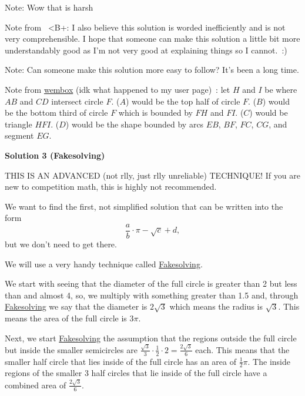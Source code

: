 \begin{enumerate}
 Note: Wow that is harsh

 Note from ~<B+: I also believe this solution is worded inefficiently and is not very comprehensible. I hope that someone can make this solution a little bit more understandably good as I'm not very good at explaining things so I cannot. :)

 Note: Can someone make this solution more easy to follow? It’s been a long time.

 Note from \href{https://artofproblemsolving.com/wiki/index.php?title=User:Wembox&action=edit&redlink=1}{wembox} (idk what happened to my user page) : let $H$ and $I$ be where $AB$ and $CD$ intersect circle $F$. ($A$) would be the top half of circle $F$. ($B$) would be the bottom third of circle $F$ which is bounded by $FH$ and $FI$. ($C$) would be triangle $HFI$. ($D$) would be the shape bounded by arcs $EB$, $BF$, $FC$, $CG$, and segment $EG$.

 



\textbf{Solution 3 (Fakesolving)}

THIS IS AN ADVANCED (not rlly, just rlly unreliable) TECHNIQUE! If you are new to competition math, this is highly not recommended.

 We want to find the first, not simplified solution that can be written into the form 
 \[\frac{a}{b}\cdot\pi-\sqrt{c}+d,\] but we don't need to get there.

 We will use a very handy technique called \href{https://artofproblemsolving.com/wiki/index.php/Fakesolving?srsltid=AfmBOooIYJBasY2JG2w6ib8tmkZzk\_s4gHj3D43Dmllv1jje2xbw7KzG}{Fakesolving}.

 We start with seeing that the diameter of the full circle is greater than 2 but less than and almost 4, so, we multiply with something greater than 1.5 and, through \href{https://artofproblemsolving.com/wiki/index.php/Fakesolving?srsltid=AfmBOooIYJBasY2JG2w6ib8tmkZzk\_s4gHj3D43Dmllv1jje2xbw7KzG}{Fakesolving} we say that the diameter is \( 2\sqrt{3} \) which means the radius is \( \sqrt{3} \). This means the area of the full circle is \( 3\pi \).

 Next, we start \href{https://artofproblemsolving.com/wiki/index.php/Fakesolving?srsltid=AfmBOooIYJBasY2JG2w6ib8tmkZzk\_s4gHj3D43Dmllv1jje2xbw7KzG}{Fakesolving} the assumption that the regions outside the full circle but inside the smaller semicircles are \( \frac{\sqrt{3}}{3} \cdot \frac{1}{2} \cdot 2 = \frac{2\sqrt{3}}{6} \) each. This means that the smaller half circle that lies inside of the full circle has an area of \( \frac{1}{2} \pi \). The inside regions of the smaller 3 half circles that lie inside of the full circle have a combined area of \( \frac{2\sqrt{3}}{6} \). 


\end{enumerate}
